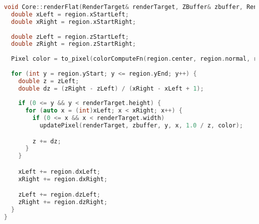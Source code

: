 \begin{lstlisting}[language=C++]
void Core::renderFlat(RenderTarget& renderTarget, ZBuffer& zbuffer, RenderRegion region, ColorComputeFn colorComputeFn) {
  double xLeft = region.xStartLeft;
  double xRight = region.xStartRight;
	
  double zLeft = region.zStartLeft;
  double zRight = region.zStartRight;
	
  Pixel color = to_pixel(colorComputeFn(region.center, region.normal, region.meshPtr->material));
	
  for (int y = region.yStart; y <= region.yEnd; y++) {
    double z = zLeft;
    double dz = (zRight - zLeft) / (xRight - xLeft + 1);
		
    if (0 <= y && y < renderTarget.height) {
      for (auto x = (int)xLeft; x < xRight; x++) {
        if (0 <= x && x < renderTarget.width)
          updatePixel(renderTarget, zbuffer, y, x, 1.0 / z, color);

        z += dz;
      }
    }

    xLeft += region.dxLeft;
    xRight += region.dxRight;

    zLeft += region.dzLeft;
    zRight += region.dzRight;
  }
}
\end{lstlisting}

